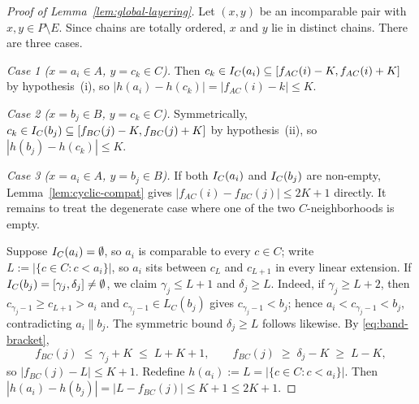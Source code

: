 \begin{proof}[Proof of Lemma~\ref{lem:global-layering}]
Let $(x, y)$ be an incomparable pair with $x, y \in P \setminus E$. Since
chains are totally ordered, $x$ and $y$ lie in distinct chains. There are
three cases.

\smallskip
\noindent\emph{Case 1 ($x = a_i \in A$, $y = c_k \in C$).} Then $c_k \in I_C(a_i)
\subseteq [f_{AC}(i) - K, f_{AC}(i) + K]$ by hypothesis~(i), so
$|h(a_i) - h(c_k)| = |f_{AC}(i) - k| \le K$.

\smallskip
\noindent\emph{Case 2 ($x = b_j \in B$, $y = c_k \in C$).} Symmetrically,
$c_k \in I_C(b_j) \subseteq [f_{BC}(j) - K, f_{BC}(j) + K]$ by
hypothesis~(ii), so $|h(b_j) - h(c_k)| \le K$.

\smallskip
\noindent\emph{Case 3 ($x = a_i \in A$, $y = b_j \in B$).} If both
$I_C(a_i)$ and $I_C(b_j)$ are non-empty, Lemma~\ref{lem:cyclic-compat}
gives $|f_{AC}(i) - f_{BC}(j)| \le 2K + 1$ directly. It remains to treat
the degenerate case where one of the two $C$-neighborhoods is empty.

Suppose $I_C(a_i) = \emptyset$, so $a_i$ is comparable to every $c \in C$;
write $L := |\{c \in C : c < a_i\}|$, so $a_i$ sits between $c_L$ and
$c_{L+1}$ in every linear extension. If $I_C(b_j) = [\gamma_j, \delta_j]
\neq \emptyset$, we claim $\gamma_j \le L + 1$ and $\delta_j \ge L$.
Indeed, if $\gamma_j \ge L + 2$, then $c_{\gamma_j - 1} \ge c_{L+1} > a_i$
and $c_{\gamma_j - 1} \in L_C(b_j)$ gives $c_{\gamma_j - 1} < b_j$; hence
$a_i < c_{\gamma_j - 1} < b_j$, contradicting $a_i \parallel b_j$. The
symmetric bound $\delta_j \ge L$ follows likewise. By
\eqref{eq:band-bracket},
\[
f_{BC}(j) \;\le\; \gamma_j + K \;\le\; L + K + 1,\qquad
f_{BC}(j) \;\ge\; \delta_j - K \;\ge\; L - K,
\]
so $|f_{BC}(j) - L| \le K + 1$. Redefine $h(a_i) := L = |\{c \in C : c < a_i\}|$.
Then $|h(a_i) - h(b_j)| = |L - f_{BC}(j)| \le K + 1 \le 2K + 1$.


\end{proof}
